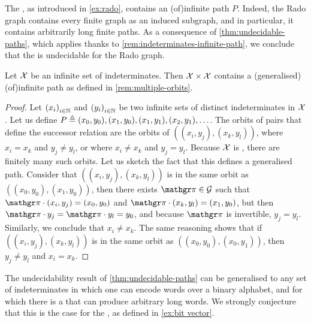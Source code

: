 \begin{example}
  \label{ex:rado-graph-path}
  The , as introduced in \cref{ex:rado},
  contains an \kl(of){infinite path} $P$. Indeed, the Rado graph
  contains every finite graph as an induced subgraph, and in particular,
  it contains arbitrarily long finite paths. 
  As a consequence of \cref{thm:undecidable-paths},
  which applies thanks to \cref{rem:indeterminates-infinite-path},
  we conclude that the 
  is undecidable for the Rado graph.
\end{example}

\begin{example}
  \label{ex:product-indets}
  Let $\mathcal{X}$ be an  infinite set of indeterminates.
  Then $\mathcal{X} \times \mathcal{X}$ contains a (generalised) \kl(of){infinite path}
  as defined in \cref{rem:multiple-orbits}.
\end{example}
\begin{proof}
  Let $\seqof{x_i}[i \in \N]$
  and $\seqof{y_i}[i \in \N]$ be two infinite sets of distinct indeterminates
  in $\mathcal{X}$.
  Let us define $P \triangleq (x_0, y_0), (x_1, y_0), (x_1, y_1), (x_2, y_1), \ldots$.
  The orbits of pairs that define the successor relation 
  are the orbits of $((x_i, y_j), (x_k, y_l))$,
  where $x_i = x_k$ and $y_j \neq y_l$, or where $x_i \neq x_k$ and $y_j = y_l$.
  Because $\mathcal{X}$ is , there are finitely many such orbits.
  Let us sketch the fact that this defines a generalised path.
  Consider that
  $((x_i, y_j), (x_k, y_l))$ is in the same orbit as $((x_0, y_0), (x_1, y_0))$,
  then there exists $\gelem \in \group$ such that
  $\gelem \cdot (x_i, y_j) = (x_0, y_0)$ and $\gelem \cdot (x_k, y_l) = (x_1, y_0)$,
  but then $\gelem \cdot y_j = \gelem \cdot y_l = y_0$, and because $\gelem$ is 
  invertible, $y_j = y_l$. Similarly, we conclude that $x_i \neq x_k$.
  The same reasoning shows that if
  $((x_i, y_j), (x_k, y_l))$ is in the same orbit as $((x_0, y_0), (x_0, y_1))$,
  then $y_j \neq y_l$ and $x_i = x_k$.
\end{proof}



\begin{remark}
  \label{rem:more-generally}
  The undecidability result of \cref{thm:undecidable-paths} can be generalised to
  any set of indeterminates in which one can encode words over a binary alphabet,
  and for which there is a  that can
  produce arbitrary long words.
  We strongly conjecture that this is the case for 
  the , as defined in 
  \cref{ex:bit vector}.
\end{remark}
